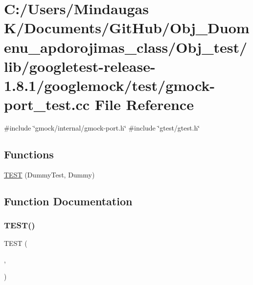 \hypertarget{_obj__test_2lib_2googletest-release-1_88_81_2googlemock_2test_2gmock-port__test_8cc}{}\section{C\+:/\+Users/\+Mindaugas K/\+Documents/\+Git\+Hub/\+Obj\+\_\+\+Duomenu\+\_\+apdorojimas\+\_\+class/\+Obj\+\_\+test/lib/googletest-\/release-\/1.8.1/googlemock/test/gmock-\/port\+\_\+test.cc File Reference}
\label{_obj__test_2lib_2googletest-release-1_88_81_2googlemock_2test_2gmock-port__test_8cc}
{\ttfamily \#include \char`\"{}gmock/internal/gmock-\/port.\+h\char`\"{}}\newline
{\ttfamily \#include \char`\"{}gtest/gtest.\+h\char`\"{}}\newline
\subsection*{Functions}
\begin{DoxyCompactItemize}
\item 
\mbox{\hyperlink{_obj__test_2lib_2googletest-release-1_88_81_2googlemock_2test_2gmock-port__test_8cc_a63812c9ef0cbc6907a251ccf919da78e}{T\+E\+ST}} (Dummy\+Test, Dummy)
\end{DoxyCompactItemize}


\subsection{Function Documentation}
\mbox{\label{_obj__test_2lib_2googletest-release-1_88_81_2googlemock_2test_2gmock-port__test_8cc_a63812c9ef0cbc6907a251ccf919da78e}} 
\subsubsection{\texorpdfstring{TEST()}{TEST()}}
{\footnotesize\ttfamily T\+E\+ST (\begin{DoxyParamCaption}\item[{Dummy\+Test}]{,  }\item[{Dummy}]{ }\end{DoxyParamCaption})}

